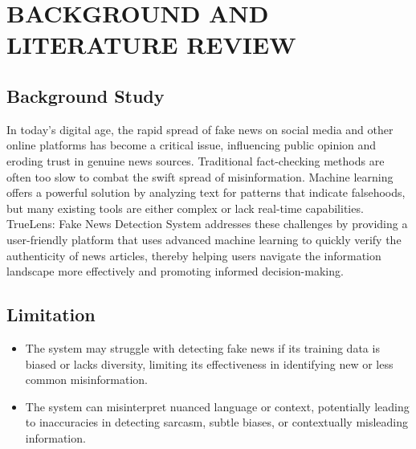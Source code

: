 \chapter{BACKGROUND AND LITERATURE REVIEW}





\section{Background Study}

In today's digital age, the rapid spread of fake news on social media and other online platforms has become a critical issue, influencing public opinion and eroding trust in genuine news sources. Traditional fact-checking methods are often too slow to combat the swift spread of misinformation. Machine learning offers a powerful solution by analyzing text for patterns that indicate falsehoods, but many existing tools are either complex or lack real-time capabilities. TrueLens: Fake News Detection System addresses these challenges by providing a user-friendly platform that uses advanced machine learning to quickly verify the authenticity of news articles, thereby helping users navigate the information landscape more effectively and promoting informed decision-making.

\section{Limitation}
\begin{itemize}
    \item The system may struggle with detecting fake news if its training data is biased or lacks diversity, limiting its effectiveness in identifying new or less common misinformation.
    \item The system can misinterpret nuanced language or context, potentially leading to inaccuracies in detecting sarcasm, subtle biases, or contextually misleading information.
\end{itemize}
